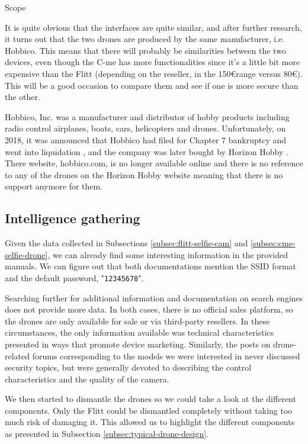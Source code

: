 \begin{chaptercover}{Scope}
\begin{tip}
It is quite obvious that the interfaces are quite similar, and after further research, it turns out that the two drones are produced by the same manufacturer, i.e. Hobbico. This means that there will probably be similarities between the two devices, even though the C-me has more functionalities since it’s a little bit more expensive than the Flitt (depending on the reseller, in the 150\euro range versus 80\euro). This will be a good occasion to compare them and see if one is more secure than the other.
\end{tip}

\begin{info}
Hobbico, Inc. was a manufacturer and distributor of hobby products including radio control airplanes, boats, cars, helicopters and drones. Unfortunately, on 2018, it was announced that Hobbico had filed for Chapter 7 bankruptcy and went into liquidation \cite{hobbico-liquidation}, and the company was later bought by Horizon Hobby \cite{horizon-hobby}. There website, hobbico.com, is no longer available online and there is no reference to any of the drones on the Horizon Hobby website meaning that there is no support anymore for them.
\end{info}

\subsection{Intelligence gathering}

Given the data collected in Subsections \ref{subsec:flitt-selfie-cam} and \ref{subsec:cme-selfie-drone}, we can already find some interesting information in the provided manuals. We can figure out that both documentations mention the SSID format and the default password, "\texttt{12345678}".

Searching further for additional information and documentation on search engines does not provide more data. In both cases, there is no official sales platform, so the drones are only available for sale or via third-party resellers. In these circumstances, the only information available was technical characteristics presented in ways that promote device marketing. Similarly, the posts on drone-related forums corresponding to the models we were interested in never discussed security topics, but were generally devoted to describing the control characteristics and the quality of the camera.

We then started to dismantle the drones so we could take a look at the different components. Only the Flitt could be dismantled completely without taking too much risk of damaging it. This allowed us to highlight the different components as presented in Subsection \ref{subsec:typical-drone-design}.


\end{chaptercover}
